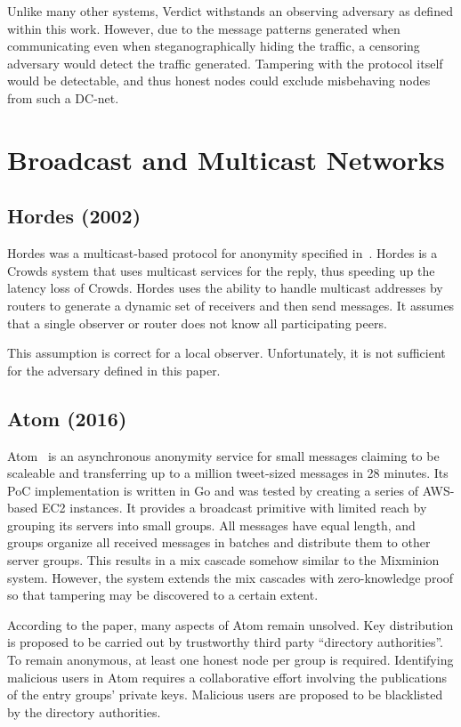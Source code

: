 Unlike many other systems, Verdict withstands an observing adversary as defined within this work. However, due to the message patterns generated when communicating even when steganographically hiding the traffic, a censoring adversary would detect the traffic generated. Tampering with the protocol itself would be detectable, and thus honest nodes could exclude misbehaving nodes from such a DC-net.

\section{Broadcast and Multicast Networks}
\subsection{Hordes (2002)}
Hordes was a multicast-based protocol for anonymity specified in~\cite{Levine:2002}. Hordes is a Crowds system that uses multicast services for the reply, thus speeding up the latency loss of Crowds. Hordes uses the ability to handle multicast addresses by routers to generate a dynamic set of receivers and then send messages. It assumes that a single observer or router does not know all participating peers. 

This assumption is correct for a local observer. Unfortunately, it is not sufficient for the adversary defined in this paper.

\subsection{Atom (2016)}
Atom~\cite{kwon2016atom} is an asynchronous anonymity service for small messages claiming to be scaleable and transferring up to a million tweet-sized messages in 28 minutes. Its PoC implementation is written in Go and was tested by creating a series of AWS-based EC2 instances. It provides a broadcast primitive with limited reach by grouping its servers into small groups. All messages have equal length, and groups organize all received messages in batches and distribute them to other server groups. This results in a mix cascade somehow similar to the Mixminion system. However, the system extends the mix cascades with zero-knowledge proof so that tampering may be discovered to a certain extent.

According to the paper, many aspects of Atom remain unsolved. Key distribution is proposed to be carried out by trustworthy third party ``directory authorities''. To remain anonymous, at least one honest node per group is required. Identifying malicious users in Atom requires a collaborative effort involving the publications of the entry groups' private keys. Malicious users are proposed to be blacklisted by the directory authorities. 

